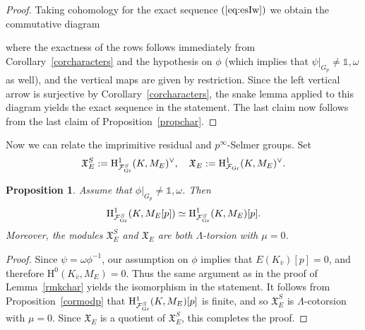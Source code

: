 \documentclass[10pt]{amsart}
\numberwithin{equation}{section}
\newtheorem{prop}[theorem]{Proposition}
\theoremstyle{definition}
\theoremstyle{remark}
\newcommand{\Fcal}{\mathcal{F}}
\newcommand{\rH}{\mathrm{H}}
\begin{document}
\begin{proof} 
Taking cohomology for the exact sequence $(\ref{eq:esIw})$ we obtain the commutative diagram 
\begin{center}
\end{center}
where the exactness of the rows follows immediately from Corollary~\ref{corcharacters} and the hypothesis on $\phi$
(which implies that $\psi|_{G_p}\neq\mathds{1},\omega$ as well), 
and the vertical maps are given by restriction. Since the left vertical arrow is surjective by Corollary~\ref{corcharacters}, the snake lemma applied to this diagram yields the exact sequence in the statement. The last claim now follows from the last claim of Proposition~\ref{propchar}.
\end{proof}

Now we can relate the imprimitive residual and $p^\infty$-Selmer groups. Set
\[ 
\mathfrak{X}_{E}^S:=\rH^1_{\Fcal_{\rm Gr}^S}(K,M_E)^{\vee}, \quad \mathfrak{X}_{E}:=\rH^1_{\Fcal_{\rm Gr}}(K,M_E)^{\vee}.
\]

\begin{prop}\label{propmodp}
Assume that $\phi\vert_{G_{p}}\neq\mathds{1},\omega$. Then 
\[
\rH^1_{\Fcal_{\rm Gr}^S}(K,M_E[p]) \simeq \rH^1_{\Fcal_{\rm Gr}^S}(K,M_E)[p]. 
\]
Moreover, the modules $\mathfrak{X}_E^S$ and $\mathfrak{X}_E$ are both $\Lambda$-torsion with $\mu=0$.
\end{prop}

\begin{proof} 
Since $\psi=\omega\phi^{-1}$, our assumption on $\phi$ implies that $E(K_{\bar{v}})[p]=0$, and therefore $\rH^0(K_{\bar{v}},M_E)=0$. Thus the same argument as in the proof of Lemma~\ref{rmkchar} yields the  isomorphism in the statement. It follows from Proposition~\ref{cormodp} that $\rH^1_{\Fcal_{\rm Gr}^S}(K,M_E)[p]$ is finite, and so $\mathfrak{X}_E^S$ is $\Lambda$-cotorsion with $\mu=0$. Since $\mathfrak{X}_E$ is a quotient of $\mathfrak{X}_E^S$, this completes the proof.
\end{proof}
\end{document}
